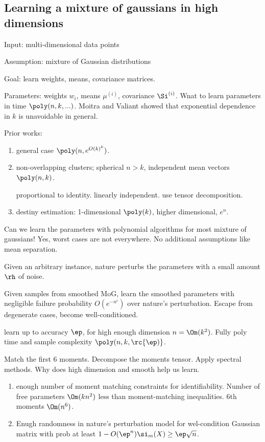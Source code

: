 \subsection{Learning a mixture of gaussians in high dimensions}



Input: multi-dimensional data points

Assumption: mixture of Gaussian distributions

Goal: learn weights, means, covariance matrices. 

Parameters: weights $w_i$, means $\mu^{(i)}$, covariance $\Si^{(i)}$. Wnat to learn parameters in time $\poly(n,k,...)$. Moitra and Valiant showed that exponential dependence in $k$ is unavoidable in general. 

Prior works:
\begin{enumerate}
\item
general case $\poly(n,e^{O(k)^k})$.
\item
non-overlapping clusters; spherical $n>k$, independent mean vectors $\poly(n,k)$.

proportional to identity. linearly independent. use tensor decomposition.
\item
destiny estimation: 1-dimensional $\poly(k)$, higher dimensional, $e^n$. 
\end{enumerate}

Can we learn the parameters with polynomial algorithms for most mixture of gaussians! Yes, worst cases are not everywhere.
No additional assumptions like mean separation.

Given an arbitrary instance, nature perturbs the parameters with a small amount $\rh$ of noise. 

Given samples from smoothed MoG, learn the smoothed parameters with negligible failure probability $O(e^{-n^c})$ over nature's perturbation. 
Escape from degenerate cases, become well-conditioned.

learn up to accuracy $\ep$, for high enough dimension $n=\Om(k^2)$. Fully poly time and sample complexity $\poly(n,k,\rc{\ep)}$. 

Match the first 6 moments. Decompose the moments tensor. Apply spectral methods. 
Why does high dimension and smooth help us learn.
\begin{enumerate}
\item
enough number of moment matching constraints for identifiability. Number of free parameters $\Om(kn^2)$ less than moment-matching inequalities. 6th moments $\Om(n^6)$.
\item
Enugh randomness in nature's perturbation model for wel-condition Gaussian matrix with prob at least $1-O(\ep^n) \si_m(X)\ge \ep \sqrt n$.
\end{enumerate}

